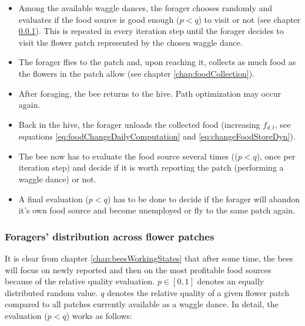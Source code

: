			\begin{itemize}
				\item Among the available waggle dances, the forager chooses randomly and evaluates if the food source is good enough ($p < q$) to visit or not (see chapter \ref{chap:foragersDistribution}). This is repeated in every iteration step until the forager decides to visit the flower patch represented by the chosen waggle dance.
				\item The forager flies to the patch and, upon reaching it, collects as much food as the flowers in the patch allow (see chapter \ref{chap:foodCollection}).
				\item After foraging, the bee returns to the hive. Path optimization may occur again.
				\item Back in the hive, the forager unloads the collected food (increasing $f_{d,t}$, see equations \ref{eq:foodChangeDailyComputation} and \ref{eq:changeFoodStoreDyn}).
				\item The bee now has to evaluate the food source several times (($p < q$), once per iteration step) and decide if it is worth reporting the patch (performing a waggle dance) or not.
				\item A final evaluation ($p < q$) has to be done to decide if the forager will abandon it's own food source and become unemployed or fly to the same patch again.
			\end{itemize}
					
		\subsubsection{Foragers' distribution across flower patches}
			\label{chap:foragersDistribution}
			It is clear from chapter \ref{chap:beesWorkingStates} that after some time, the bees will focus on newly reported and then on the most profitable food sources because of the relative quality evaluation. $p \in {[0,1]}$ denotes an equally distributed random value. $q$ denotes the relative quality of a given flower patch compared to all patches currently available as a waggle dance. In detail, the evaluation ($p < q$) works as follows:\\
			

